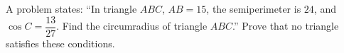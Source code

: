 A problem states: ``In triangle $ABC$, $AB=15$, the semiperimeter is $24$, and $\cos C=\dfrac{13}{27}$. Find the circumradius of triangle $ABC$.'' Prove that no triangle satisfies these conditions.
